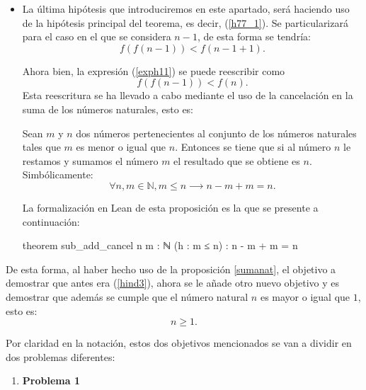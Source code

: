 \begin{demostracion}
\begin{itemize}
\begin{itemize}
      \item La última hipótesis que introduciremos en este apartado,
        será haciendo uso de la hipótesis principal del teorema,
        es decir, (\ref{h77_1}). Se particularizará para el caso en el
        que se considera \(n-1\), de esta forma se tendría:
        \begin{equation}\label{exph11}
          f(f(n-1)) < f(n-1+1).
        \end{equation}

        Ahora bien, la expresión (\ref{exph11}) se puede reescribir
        como
        \begin{equation}\label{h77_11}\tag{h11}
          f(f(n-1)) < f(n).
        \end{equation}
        Esta reescritura se ha llevado a cabo mediante el uso de
        la cancelación en la suma de los números naturales, esto es:

        \begin{proposicion}\label{sumanat}
          Sean \(m\) y \(n\) dos números pertenecientes al conjunto
          de los números naturales tales que \(m\) es menor o igual
          que \(n\). Entonces se tiene que si al número \(n\) le
          restamos y sumamos el número \(m\) el resultado que se
          obtiene es \(n\). Simbólicamente:
          \begin{equation}
            ∀ n,m ∈ ℕ, m ≤ n ⟶ n-m+m = n.
          \end{equation}
        \end{proposicion}

        La formalización en Lean de esta proposición es la que se
        presente a continuación:
        \begin{leancode}
          theorem sub_add_cancel {n m : ℕ} (h : m ≤ n) : n - m + m = n
        \end{leancode}
      \end{itemize}

      De esta forma, al haber hecho uso de la proposición \ref{sumanat},
      el objetivo a demostrar que antes era (\ref{hind3}), ahora se le
      añade otro nuevo objetivo y es demostrar que además se cumple que
      el número natural \(n\) es mayor o igual que \(1\), esto es:
      \begin{equation}\label{n1}
        n ≥ 1.
      \end{equation}

      Por claridad en la notación, estos dos objetivos mencionados
      se van a dividir en dos problemas diferentes:
      \begin{enumerate}
      \item \textbf{Problema 1}


\end{enumerate}
\end{itemize}
\end{demostracion}
